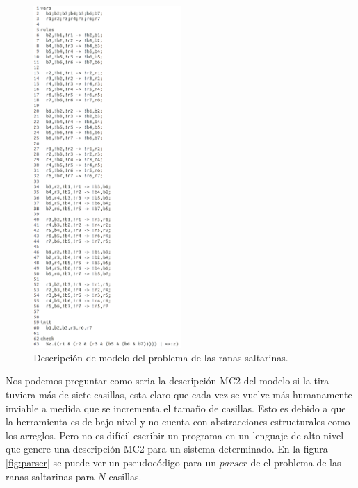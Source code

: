 \begin{figure}[H]
  \centering
  \includegraphics[width=0.5\textwidth]{Figures/ranas.png}
  \caption{Descripción de modelo del problema de las ranas saltarinas.}
  \label{fig:ranas}
\end{figure}

\noindent Nos podemos preguntar como seria la descripción MC2 del modelo si la tira tuviera más de siete casillas, esta claro que cada vez se vuelve más humanamente inviable a medida que se incrementa el tamaño de casillas. Esto es debido a que la herramienta es de bajo nivel y no cuenta con abstracciones estructurales como los arreglos. Pero no es difícil escribir un programa en un lenguaje de alto nivel que genere una descripción MC2 para un sistema determinado. En la figura \ref{fig:parser} se puede ver un pseudocódigo para un $parser$ de el problema de las ranas saltarinas para $N$ casillas.

